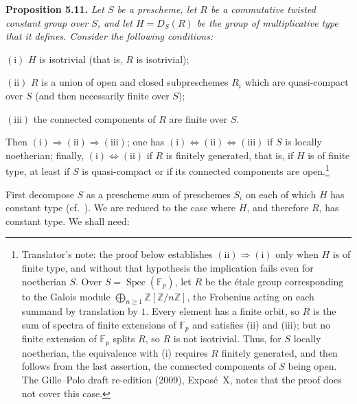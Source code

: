 \par\medskip\noindent
\textbf{Proposition 5.11.}\enspace
\begingroup\itshape
Let \(S\) be a prescheme, let \(R\) be a commutative twisted constant
group over \(S\), and let \(H=D_S(R)\) be the group of multiplicative type
that it defines. Consider the following conditions:

\smallskip
\noindent
\(\mathrm{(i)}\) \(H\) is isotrivial (that is, \(R\) is isotrivial);

\smallskip
\noindent
{}\(\mathrm{(ii)}\) \(R\) is a union of open and closed subpreschemes \(R_i\)
which are quasi-compact over \(S\) (and then necessarily finite over \(S\));

\smallskip
\noindent
\(\mathrm{(iii)}\) the connected components of \(R\) are finite over \(S\).

\smallskip
Then \(\mathrm{(i)}\Rightarrow\mathrm{(ii)}\Rightarrow\mathrm{(iii)}\); one
has \(\mathrm{(i)}\Leftrightarrow\mathrm{(ii)}\Leftrightarrow\mathrm{(iii)}\)
if \(S\) is locally noetherian; finally,
\(\mathrm{(i)}\Leftrightarrow\mathrm{(ii)}\) if \(R\) is finitely generated,
that is, if \(H\) is of finite type, at least if \(S\) is quasi-compact or if
its connected components are open.\footnote{Translator's note: the proof below
establishes \(\mathrm{(ii)}\Rightarrow\mathrm{(i)}\) only when \(H\) is of
finite type, and without that hypothesis the implication fails even for
noetherian \(S\). Over \(S=\operatorname{Spec}(\mathbb F_p)\), let \(R\) be
the étale group corresponding to the Galois module
\(\bigoplus_{n\geq1}\mathbb Z[\mathbb Z/n\mathbb Z]\), the Frobenius acting on
each summand by translation by \(1\). Every element has a finite orbit, so
\(R\) is the sum of spectra of finite extensions of \(\mathbb F_p\) and
satisfies (ii) and (iii); but no finite extension of \(\mathbb F_p\) splits
\(R\), so \(R\) is not isotrivial. Thus, for \(S\) locally noetherian, the
equivalence with (i) requires \(R\) finitely generated, and then follows from
the last assertion, the connected components of \(S\) being open. The
Gille--Polo draft re-edition (2009), Expos\'e~X, notes that the proof does not
cover this case.}
\par\endgroup

First decompose \(S\) as a prescheme sum of preschemes \(S_i\) on each of
which \(H\) has constant type (cf.\ ). We are reduced to the case
where \(H\), and therefore \(R\), has constant type. We shall need:

